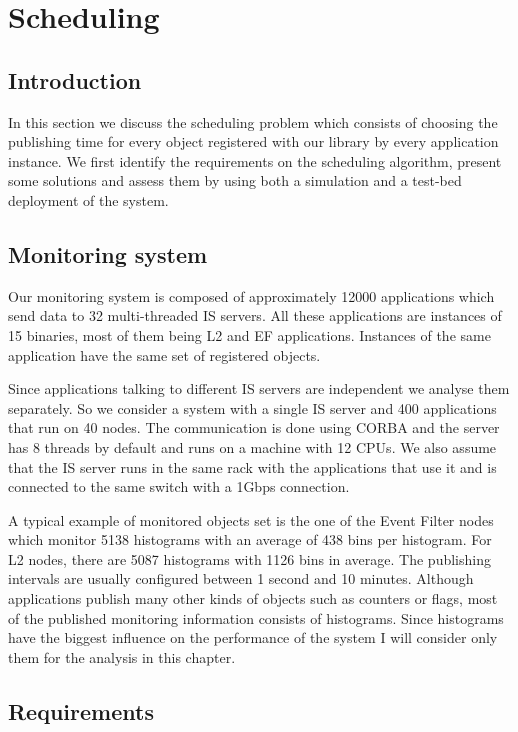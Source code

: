 \chapter{Scheduling} %
\label{Capitolul4}

\section{Introduction}

In this section we discuss the scheduling problem which consists of choosing the publishing time for every object registered with our library by every application instance. We first identify the requirements on the scheduling algorithm, present some solutions and assess them by using both a simulation and a test-bed deployment of the system.

\section{Monitoring system}

Our monitoring system is composed of approximately 12000 applications which send data to 32 multi-threaded IS servers.  All these applications are instances of 15 binaries, most of them being L2 and EF applications. Instances of the same application have the same set of registered objects.

Since applications talking to different IS servers are independent we analyse them separately. So we consider a system with a single IS server and 400 applications that run on 40 nodes. The communication is done using CORBA \citep{vinoski1997corba} and the server has 8 threads by default and runs on a machine with 12 CPUs. We also assume that the IS server runs in the same rack with the applications that use it and is connected to the same switch with a 1Gbps connection.

A typical example of monitored objects set is the one of the Event Filter nodes which monitor 5138 histograms with an average of 438 bins per histogram. For L2 nodes, there are 5087 histograms with 1126 bins in average. The publishing intervals are usually configured between 1 second and 10 minutes. Although applications publish many other kinds of objects such as counters or flags, most of the published monitoring information consists of histograms. Since histograms have the biggest influence on the performance of the system I will consider only them for the analysis in this chapter.

\section{Requirements}

